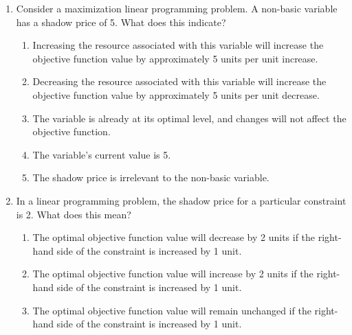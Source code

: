 \documentclass{article}%
\begin{document}
\begin{enumerate}
\begin{enumerate}%
\item The constraint is binding, and a small change in its RHS will significantly impact the optimal objective function value.%
\item The constraint is non-binding, and a small change in its RHS will not affect the optimal objective function value.%
\item The constraint is binding, and a small change in its RHS will not affect the optimal objective function value.%
\item The constraint is non-binding, and a small change in its RHS will significantly impact the optimal objective function value.%
\item The shadow price of 0 is meaningless and provides no information about the constraint.%
\end{enumerate}%
\vspace{1em}%
\item Consider a maximization linear programming problem.  A non-basic variable has a shadow price of 5. What does this indicate?%
\begin{enumerate}%
\item Increasing the resource associated with this variable will increase the objective function value by approximately 5 units per unit increase.%
\item Decreasing the resource associated with this variable will increase the objective function value by approximately 5 units per unit decrease.%
\item The variable is already at its optimal level, and changes will not affect the objective function.%
\item The variable's current value is 5.%
\item The shadow price is irrelevant to the non-basic variable.%
\end{enumerate}%
\vspace{1em}%
\item In a linear programming problem, the shadow price for a particular constraint is 2.  What does this mean?%
\begin{enumerate}%
\item The optimal objective function value will decrease by 2 units if the right-hand side of the constraint is increased by 1 unit.%
\item The optimal objective function value will increase by 2 units if the right-hand side of the constraint is increased by 1 unit.%
\item The optimal objective function value will remain unchanged if the right-hand side of the constraint is increased by 1 unit.%

\end{enumerate}
\end{enumerate}
\end{document}
